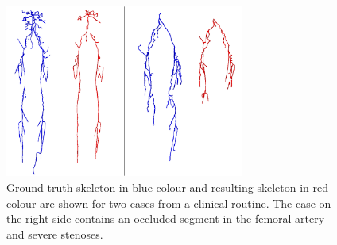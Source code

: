 \begin{enumerate}
\begin{figure}[!htbp]
	\centering
	\includegraphics[width=0.7\textwidth]{figures/research/kristinacomparison.pdf}
	\caption{Ground truth skeleton in blue colour and resulting skeleton in red colour are shown for two cases from a clinical routine. The case on the right side contains an occluded segment in the femoral artery and severe stenoses.} 
	\label{fig:krstinacomparison}
\end{figure}





\newpage


\end{enumerate}
